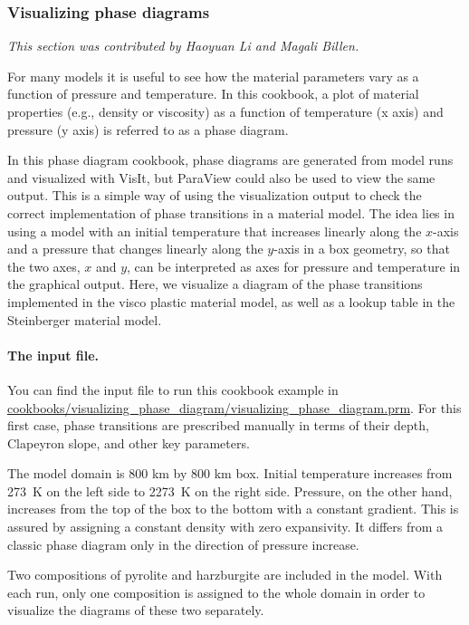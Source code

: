 \subsubsection{Visualizing phase diagrams}
\label{sec:visualizing-phase-diagram}
\textit{This section was contributed by Haoyuan Li and Magali Billen.}

For many models it is useful to see how the material parameters vary as a function of pressure and temperature. In this cookbook, a plot of material properties (e.g., density or viscosity) as a function of temperature (x axis) and pressure (y axis) is referred to as a phase diagram. 

In this phase diagram cookbook, phase diagrams are generated from model runs and visualized with VisIt, but ParaView could also be used to view the same output. %
This is a simple way of using the visualization output to check the correct implementation of phase transitions in a material model. 
The idea lies in using a model with an initial temperature that increases linearly along the $x$-axis and a pressure that changes linearly along the $y$-axis in a box geometry, so that the two axes, $x$ and $y$, can be interpreted as axes for pressure and temperature in the graphical output. 
Here, we visualize a diagram of the phase transitions implemented in the visco plastic material model, as well as a lookup table in the Steinberger material model. 

\paragraph{The input file.}
You can find the input file to run this cookbook example in \url{cookbooks/visualizing_phase_diagram/visualizing_phase_diagram.prm}. For this first case, phase transitions are prescribed manually in terms of their depth, Clapeyron slope, and other key parameters. 

The model domain is  800 km  by 800 km box. %
Initial temperature increases from \SI{273}{K} on the left side to \SI{2273}{K} on the right side. %
Pressure, on the other hand, increases from the top of the box to the bottom with a constant gradient.
This is assured by assigning a constant density with zero expansivity.
It differs from a classic phase diagram only in the direction of pressure increase.

Two compositions of pyrolite and harzburgite are included in the model. %
With each run, only one composition is assigned to the whole domain in order to visualize the diagrams of these two separately.

